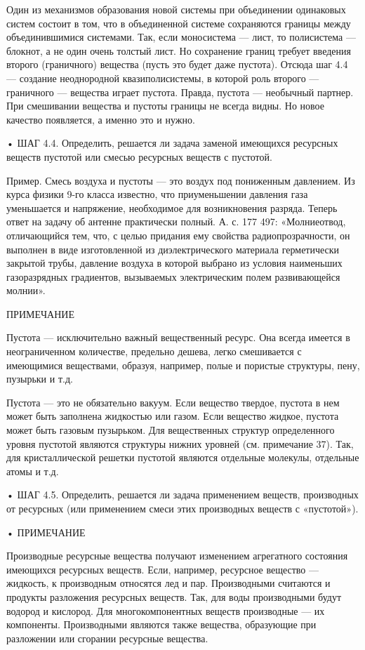 Один  из   механизмов  образования   новой  системы   при  объединении
одинаковых  систем   состоит  в   том,  что  в   объединенной  системе
сохраняются  границы   между  объединившимися  системами.   Так,  если
моносистема — лист, то полисистема —  блокнот, а не один очень толстый
лист.  Но  сохранение  границ требует  введения  второго  (граничного)
вещества (пусть  это будет  даже пустота). Отсюда  шаг 4.4  — создание
неоднородной квазиполисистемы,  в которой роль второго  — граничного —
вещества  играет пустота.  Правда,  пустота —  необычный партнер.  При
смешивании  вещества  и пустоты  границы  не  всегда видны.  Но  новое
качество появляется, а именно это и нужно.


• ШАГ 4.4. Определить, решается  ли задача заменой имеющихся ресурсных
веществ пустотой или смесью ресурсных веществ с пустотой.

Пример. Смесь воздуха и пустоты — это воздух под пониженным давлением.
Из курса физики 9-го класса  известно, что приуменьшении давления газа
уменьшается  и  напряжение,  необходимое  для  возникновения  разряда.
Теперь  ответ на  задачу  об  антенне практически  полный.  А. с.  177
497:  «Молниеотвод,  отличающийся  тем,  что,  с  целью  придания  ему
свойства  радиопрозрачности,  он  выполнен  в  виде  изготовленной  из
диэлектрического  материала  герметически   закрытой  трубы,  давление
воздуха  в   которой  выбрано  из  условия   наименьших  газоразрядных
градиентов, вызываемых электрическим полем развивающейся молнии».

ПРИМЕЧАНИЕ

Пустота — исключительно важный вещественный ресурс. Она всегда имеется
в  неограниченном количестве,  предельно дешева,  легко смешивается  с
имеющимися веществами, образуя, например,  полые и пористые структуры,
пену, пузырьки и т.д.

Пустота — это не обязательно  вакуум. Если вещество твердое, пустота в
нем может  быть заполнена жидкостью  или газом. Если  вещество жидкое,
пустота  может  быть  газовым  пузырьком.  Для  вещественных  структур
определенного уровня  пустотой являются структуры нижних  уровней (см.
примечание  37). Так,  для кристаллической  решетки пустотой  являются
отдельные молекулы, отдельные атомы и т.д.

•  ШАГ  4.5.  Определить,  решается  ли  задача  применением  веществ,
производных  от  ресурсных  (или применением  смеси  этих  производных
веществ с «пустотой»).

• ПРИМЕЧАНИЕ

Производные   ресурсные  вещества   получают  изменением   агрегатного
состояния  имеющихся  ресурсных  веществ.  Если,  например,  ресурсное
вещество — жидкость,  к производным относятся лед  и пар. Производными
считаются  и  продукты разложения  ресурсных  веществ.  Так, для  воды
производными будут  водород и кислород. Для  многокомпонентных веществ
производные  — их  компоненты. Производными  являются также  вещества,
образующие при разложении или сгорании ресурсные вещества.



